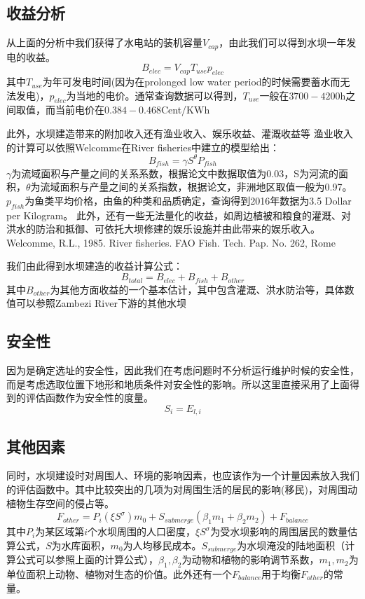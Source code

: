 \documentclass[nocover]{cumcmart}
\begin{document}
\subsection{收益分析}
从上面的分析中我们获得了水电站的装机容量$V_{cap}$，由此我们可以得到水坝一年发电的收益。
\begin{equation}
B_{elec} = V_{cap}T_{use}p_{elec}
\end{equation}
其中$T_{use}$为年可发电时间(因为在prolonged low water period的时候需要蓄水而无法发电)，$p_{elec}$为当地的电价。通常查询数据可以得到，$T_{use}$一般在$3700-4200$h之间取值，而当前电价在$0.384-0.468$Cent/KWh

此外，水坝建造带来的附加收入还有渔业收入、娱乐收益、灌溉收益等
渔业收入的计算可以依照Welcomme在River fisheries中建立的模型给出：
\begin{equation}
B_{fish} = {\gamma}S^{\theta}P_{fish}
\end{equation}
$\gamma$为流域面积与产量之间的关系系数，根据论文中数据取值为0.03，S为河流的面积，$\theta$为流域面积与产量之间的关系指数，根据论文，非洲地区取值一般为0.97。
$p_{fish}$为鱼类平均价格，由鱼的种类和品质确定，查询得到2016年数据为3.5 Dollar per Kilogram。
此外，还有一些无法量化的收益，如周边植被和粮食的灌溉、对洪水的防治和抵御、可依托大坝修建的娱乐设施并由此带来的娱乐收入。
Welcomme, R.L., 1985. River fisheries. FAO Fish. Tech. Pap. No. 262, Rome

我们由此得到水坝建造的收益计算公式：
\begin{equation}
B_{total} = B_{elec} + B_{fish} + B_{other}
\end{equation}
其中$B_{other}$为其他方面收益的一个基本估计，其中包含灌溉、洪水防治等，具体数值可以参照Zambezi River下游的其他水坝
\subsection{安全性}
因为是确定选址的安全性，因此我们在考虑问题时不分析运行维护时候的安全性，而是考虑选取位置下地形和地质条件对安全性的影响。所以这里直接采用了上面得到的评估函数作为安全性的度量。
\begin{equation}
S_{i} = E_{l,i}
\end{equation}

\subsection{其他因素}
同时，水坝建设时对周围人、环境的影响因素，也应该作为一个计量因素放入我们的评估函数中。其中比较突出的几项为对周围生活的居民的影响(移民)，对周围动植物生存空间的侵占等。
\begin{equation}
F_{other} = P_{i}({\xi}S^{\sigma})m_{0} + S_{submerge}(\beta_{1}m_{1} + \beta_{2}m_{2}) + F_{balance}
\end{equation}
其中$P_{i}$为某区域第$i$个水坝周围的人口密度，${\xi}S^{\sigma}$为受水坝影响的周围居民的数量估算公式，$S$为水库面积，$m_{0}$为人均移民成本。$S_{submerge}$为水坝淹没的陆地面积（计算公式可以参照上面的计算公式），$\beta_{1},\beta_{2}$为动物和植物的影响调节系数，$m_{1},m_{2}$为单位面积上动物、植物对生态的价值。此外还有一个$F_{balance}$用于均衡$F_{other}$的常量。
\end{document}
